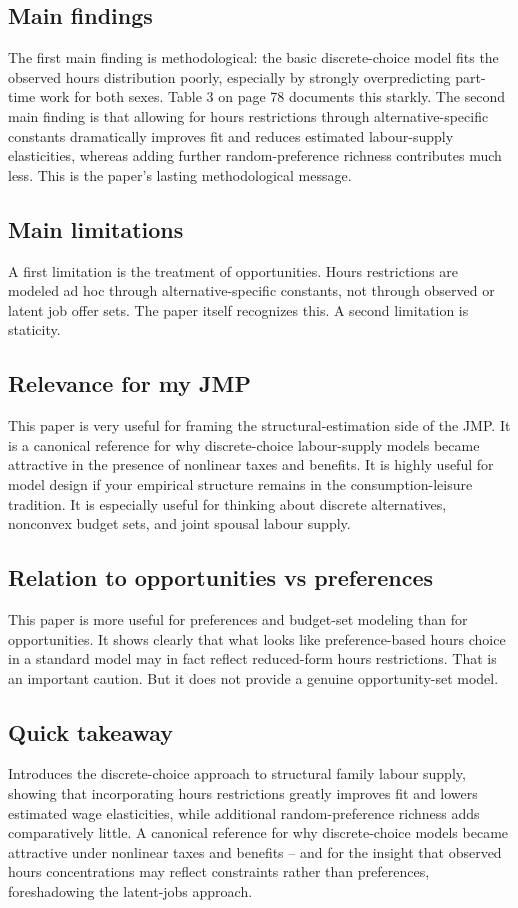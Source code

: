 \documentclass[11pt,a4paper]{article}
\begin{document}
\subsection*{Main findings}
The first main finding is methodological: the basic discrete-choice model fits the observed hours distribution poorly, especially by strongly overpredicting part-time work for both sexes. Table 3 on page 78 documents this starkly. The second main finding is that allowing for hours restrictions through alternative-specific constants dramatically improves fit and reduces estimated labour-supply elasticities, whereas adding further random-preference richness contributes much less. This is the paper's lasting methodological message.

\subsection*{Main limitations}
A first limitation is the treatment of opportunities. Hours restrictions are modeled ad hoc through alternative-specific constants, not through observed or latent job offer sets. The paper itself recognizes this. A second limitation is staticity.

\subsection*{Relevance for my JMP}
This paper is very useful for framing the structural-estimation side of the JMP. It is a canonical reference for why discrete-choice labour-supply models became attractive in the presence of nonlinear taxes and benefits. It is highly useful for model design if your empirical structure remains in the consumption-leisure tradition. It is especially useful for thinking about discrete alternatives, nonconvex budget sets, and joint spousal labour supply.

\subsection*{Relation to opportunities vs preferences}
This paper is more useful for preferences and budget-set modeling than for opportunities. It shows clearly that what looks like preference-based hours choice in a standard model may in fact reflect reduced-form hours restrictions. That is an important caution. But it does not provide a genuine opportunity-set model.

\subsection*{Quick takeaway}
Introduces the discrete-choice approach to structural family labour supply, showing that incorporating hours restrictions greatly improves fit and lowers estimated wage elasticities, while additional random-preference richness adds comparatively little. A canonical reference for why discrete-choice models became attractive under nonlinear taxes and benefits -- and for the insight that observed hours concentrations may reflect constraints rather than preferences, foreshadowing the latent-jobs approach.
\end{document}
